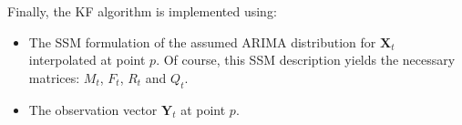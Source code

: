 \documentclass{article}
\theoremstyle{definition}
\theoremstyle{definition}
\theoremstyle{remark}
\theoremstyle{mythmstyle}
\begin{document}
Finally, the KF algorithm is implemented using:
\begin{itemize}
    \item The SSM formulation of the assumed ARIMA distribution for $\bm{X}_t$ interpolated at point $p$. Of course, this SSM description yields the necessary matrices: $M_t$, $F_t$, $R_t$ and $Q_t$.
    \item The observation vector $\bm{Y}_t$ at point $p$.
\end{itemize}


\end{document}
